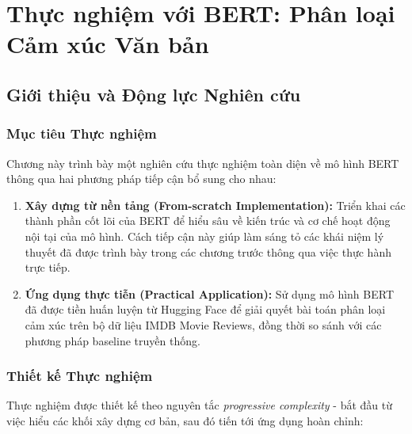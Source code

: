 \section{Thực nghiệm với BERT: Phân loại Cảm xúc Văn bản}
\label{sec:thuc_nghiem_bert}

\subsection{Giới thiệu và Động lực Nghiên cứu}
\label{ssec:gioi_thieu_dong_luc}

\subsubsection{Mục tiêu Thực nghiệm}
Chương này trình bày một nghiên cứu thực nghiệm toàn diện về mô hình BERT thông qua hai phương pháp tiếp cận bổ sung cho nhau:

\begin{enumerate}
    \item \textbf{Xây dựng từ nền tảng (From-scratch Implementation):} Triển khai các thành phần cốt lõi của BERT để hiểu sâu về kiến trúc và cơ chế hoạt động nội tại của mô hình. Cách tiếp cận này giúp làm sáng tỏ các khái niệm lý thuyết đã được trình bày trong các chương trước thông qua việc thực hành trực tiếp.
    
    \item \textbf{Ứng dụng thực tiễn (Practical Application):} Sử dụng mô hình BERT đã được tiền huấn luyện từ Hugging Face để giải quyết bài toán phân loại cảm xúc trên bộ dữ liệu IMDB Movie Reviews, đồng thời so sánh với các phương pháp baseline truyền thống.
\end{enumerate}

\subsubsection{Thiết kế Thực nghiệm}
Thực nghiệm được thiết kế theo nguyên tắc \textit{progressive complexity} - bắt đầu từ việc hiểu các khối xây dựng cơ bản, sau đó tiến tới ứng dụng hoàn chỉnh:

